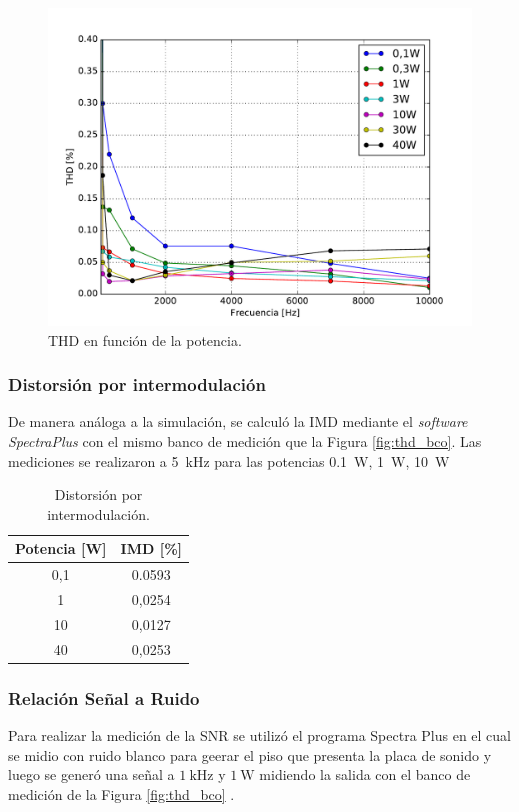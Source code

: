 		\begin{figure}[H]
			\centering
			\includegraphics[scale=0.6]{./Figuras/thd_zoom.pdf}
			\caption{THD en función de la potencia.}
		\end{figure}

		\subsubsection{Distorsión por intermodulación}

		De manera análoga a la simulación, se calculó la IMD mediante el \textit{software SpectraPlus} con el mismo banco de medición que la Figura \ref{fig:thd_bco}. Las mediciones se realizaron a \SI{5}{\kilo\hertz} para las potencias \SI{0.1}{\watt}, \SI{1}{\watt}, \SI{10}{\watt}

			\begin{table}[H]
				\centering
				\begin{tabular}{cc}
				\toprule
				Potencia [W] & IMD [\%]\\
				\midrule
				0,1 & 0.0593 \\
				1 & 0,0254 \\
				10 & 0,0127 \\
				40 & 0,0253 \\
				\bottomrule
				\end{tabular}
				\caption{Distorsión por intermodulación.}
			\end{table}



		\subsubsection{Relación Señal a Ruido}
		Para realizar la medición de la SNR se utilizó el programa Spectra Plus en el cual se midio con ruido blanco para geerar el piso que presenta la placa de sonido y luego se generó una señal a $\SI{1}{\kHz}$ y $\SI{1}{\W}$ midiendo la salida con el banco de medición de la Figura \ref{fig:thd_bco} .




